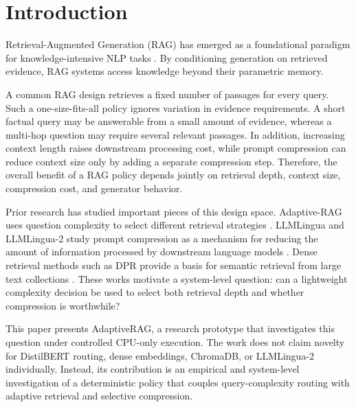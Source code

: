 \documentclass[conference]{IEEEtran}
\begin{document}
\section{Introduction}

Retrieval-Augmented Generation (RAG) has emerged as a foundational paradigm for knowledge-intensive NLP tasks \cite{lewis2020rag,guu2020realm}. By conditioning generation on retrieved evidence, RAG systems access knowledge beyond their parametric memory.

A common RAG design retrieves a fixed number of passages for every query. Such a one-size-fits-all policy ignores variation in evidence requirements. A short factual query may be answerable from a small amount of evidence, whereas a multi-hop question may require several relevant passages. In addition, increasing context length raises downstream processing cost, while prompt compression can reduce context size only by adding a separate compression step. Therefore, the overall benefit of a RAG policy depends jointly on retrieval depth, context size, compression cost, and generator behavior.

Prior research has studied important pieces of this design space. Adaptive-RAG uses question complexity to select different retrieval strategies \cite{jeong2024adaptiverag}. LLMLingua and LLMLingua-2 study prompt compression as a mechanism for reducing the amount of information processed by downstream language models \cite{jiang2023llmlingua,pan2024llmlingua2}. Dense retrieval methods such as DPR provide a basis for semantic retrieval from large text collections \cite{karpukhin2020dpr}. These works motivate a system-level question: can a lightweight complexity decision be used to select both retrieval depth and whether compression is worthwhile?

This paper presents AdaptiveRAG, a research prototype that investigates this question under controlled CPU-only execution. The work does not claim novelty for DistilBERT routing, dense embeddings, ChromaDB, or LLMLingua-2 individually. Instead, its contribution is an empirical and system-level investigation of a deterministic policy that couples query-complexity routing with adaptive retrieval and selective compression.
\end{document}
